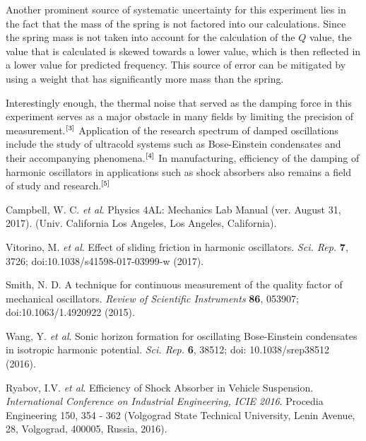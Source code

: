 \documentclass[twoside,twocolumn]{article}
\begin{document}
\hfill

\noindent Another prominent source of systematic uncertainty for this experiment lies in the fact that the mass of the spring is not factored into our calculations. Since the spring mass is not taken into account for the calculation of the $Q$ value, the value that is calculated is skewed towards a lower value, which is then reflected in a lower value for predicted frequency. This source of error can be mitigated by using a weight that has significantly more mass than the spring.

\hfill

\noindent Interestingly enough, the thermal noise that served as the damping force in this experiment serves as a major obstacle in many fields by limiting the precision of measurement.$\textsuperscript{[3]}$  Application of the research spectrum of damped oscillations include the study of ultracold systems such as Bose-Einstein condensates and their accompanying phenomena.$\textsuperscript{[4]}$ In manufacturing, efficiency of the damping of harmonic oscillators in applications such as shock absorbers also remains a field of study and research.$\textsuperscript{[5]}$



\begin{thebibliography}{99} %

Campbell, W. C. \textit{et al}. Physics 4AL: Mechanics Lab Manual (ver. August 31, 2017).
(Univ. California Los Angeles, Los Angeles, California).

Vitorino, M. \textit{et al}. Effect of sliding friction in harmonic oscillators. 
\textit{Sci. Rep.} \textbf{7}, 3726; doi:10.1038/s41598-017-03999-w (2017).


Smith, N. D. A technique for continuous measurement of the quality factor of mechanical oscillators.
\textit{Review of Scientific Instruments} \textbf{86}, 053907; doi:10.1063/1.4920922 (2015).

Wang, Y. \textit{et al}. Sonic horizon formation for oscillating Bose-Einstein condensates in isotropic harmonic potential. 
\textit{Sci. Rep.} \textbf{6}, 38512; doi: 10.1038/srep38512 (2016).

Ryabov, I.V. \textit{et al}. Efficiency of Shock Absorber in Vehicle Suspension.
\textit{International Conference on Industrial Engineering, ICIE 2016}. Procedia Engineering 150, 354 - 362 
(Volgograd State Technical University, Lenin Avenue, 28, Volgograd, 400005, Russia, 2016).
\end{thebibliography}

\end{document}
